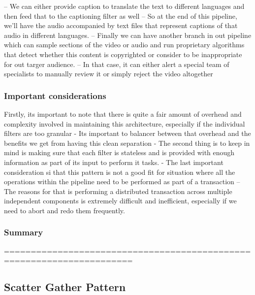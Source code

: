 \documentclass[a4paper, 11pt]{book}
\begin{document}
    -- We can either provide caption to translate the text to different languages and then feed that to the captioning filter as well
    -- So at the end of this pipeline, we'll have the audio accompanied by text files that represent captions of that audio in different languages.
    -- Finally we can have another branch in out pipeline which can sample sections of the video or audio and run proprietary algorithms that detect whether this content is copyrighted or consider to be inappropriate for out targer audience.
    -- In that case, it can either alert a special team of specialists to manually review it or simply reject the video altogether

    \subsubsection{Important considerations}
    Firstly, its important to note that there is quite a fair amount of overhead and complexity involved in maintaining this architecture, especially if the individual filters are too granular
    - Its important to balancer between that overhead and the benefits we get from having this clean separation
    - The second thing is to keep in mind is making sure that each filter is stateless and is provided with enough information as part of its input to perform it tasks.
    - The last important consideration si that this pattern is not a good fit for situation where all the operations within the pipeline need to be performed as part of a transaction
    -- The reasons for that is performing a distributed transaction across multiple independent components is extremely difficult and inefficient, especially if we need to abort and redo them frequently.

    \subsubsection{Summary}
    ======================================================================

    \subsection{Scatter Gather Pattern}
\end{document}
